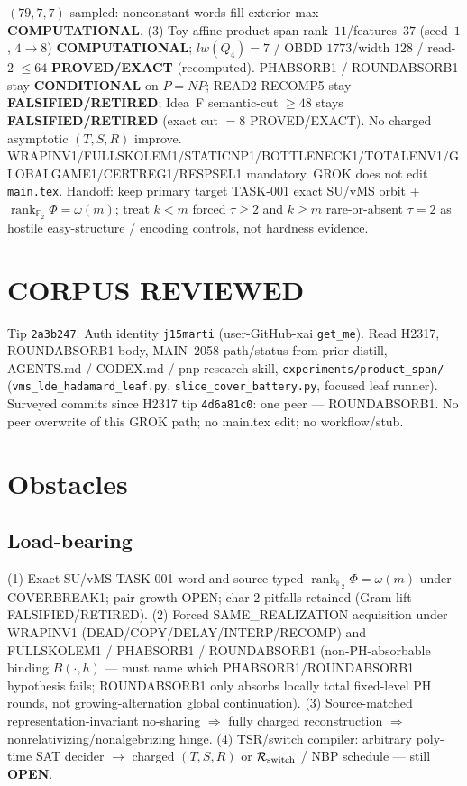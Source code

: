 \documentclass[11pt]{article}
\begin{document}
$(79,7,7)$ sampled: nonconstant words fill exterior max --- \textbf{COMPUTATIONAL}.
(3) Toy affine product-span rank~$11$/features~$37$ (seed~$1$, $4\to8$)
\textbf{COMPUTATIONAL}; $lw(Q_4)=7$ / OBDD $1773$/width $128$ / read-$2$ $\le64$
\textbf{PROVED/EXACT} (recomputed).
PHABSORB1 / ROUNDABSORB1 stay \textbf{CONDITIONAL} on $P=NP$; READ2-RECOMP5 stay \textbf{FALSIFIED/RETIRED};
Idea~F semantic-cut $\ge48$ stays \textbf{FALSIFIED/RETIRED} (exact cut $=8$ PROVED/EXACT).
No charged asymptotic $(T,S,R)$ improve.
WRAPINV1/FULLSKOLEM1/STATICNP1/BOTTLENECK1/TOTALENV1/GLOBALGAME1/CERTREG1/RESPSEL1 mandatory.
GROK does not edit \texttt{main.tex}.
Handoff: keep primary target TASK-001 exact SU/vMS orbit + $\operatorname{rank}_{\mathbb F_2}\Phi=\omega(m)$;
treat $k{<}m$ forced $\tau{\ge}2$ and $k{\ge}m$ rare-or-absent $\tau{=}2$ as hostile easy-structure /
encoding controls, not hardness evidence.

\section*{CORPUS REVIEWED}
Tip \texttt{2a3b247}. Auth identity \texttt{j15marti} (user-GitHub-xai \texttt{get\_me}).
Read H2317, ROUNDABSORB1 body, MAIN~2058 path/status from prior distill, AGENTS.md /
CODEX.md / pnp-research skill,
\texttt{experiments/product\_span/} (\texttt{vms\_lde\_hadamard\_leaf.py},
\texttt{slice\_cover\_battery.py}, focused leaf runner).
Surveyed commits since H2317 tip \texttt{4d6a81c0}: one peer --- ROUNDABSORB1.
No peer overwrite of this GROK path; no main.tex edit; no workflow/stub.

\section*{Obstacles}
\subsection*{Load-bearing}
(1) Exact SU/vMS TASK-001 word and source-typed
$\operatorname{rank}_{\mathbb F_2}\Phi=\omega(m)$ under COVERBREAK1; pair-growth OPEN;
char-$2$ pitfalls retained (Gram lift FALSIFIED/RETIRED).
(2) Forced SAME\_REALIZATION acquisition under WRAPINV1
(DEAD/COPY/DELAY/INTERP/RECOMP) and FULLSKOLEM1 / PHABSORB1 / ROUNDABSORB1
(non-PH-absorbable binding $B(\cdot,h)$ --- must name which PHABSORB1/ROUNDABSORB1 hypothesis fails;
ROUNDABSORB1 only absorbs locally total fixed-level PH rounds, not growing-alternation global continuation).
(3) Source-matched representation-invariant no-sharing $\Rightarrow$ fully charged reconstruction
$\Rightarrow$ nonrelativizing/nonalgebrizing hinge.
(4) TSR/switch compiler: arbitrary poly-time SAT decider $\to$ charged $(T,S,R)$ or
$\mathcal R_{\rm switch}$ / NBP schedule --- still \textbf{OPEN}.
\end{document}
